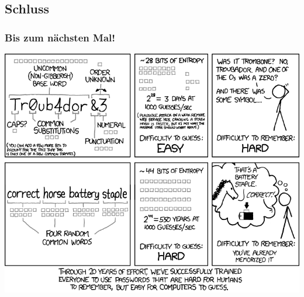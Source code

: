 \subsection{Schluss}

\begin{frame}
\frametitle{Bis zum nächsten Mal!}
\begin{center}
  \includegraphics[width=1 \textheight]{images/password_strength.png}
\end{center}
\end{frame}

